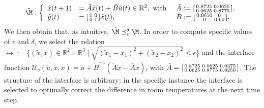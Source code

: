 \documentclass[letterpaper, 10 pt, conference]{amsart}
\theoremstyle{definition}
\theoremstyle{example}
\theoremstyle{remark}
\newcommand{\eps}{\epsilon}
\newcommand{\InF}{\mathcal{U}_{v}}
\begin{document}
 \begin{align}
\tilde\M:\left\{\begin{array}{lll}
 \tilde x(t+1)&= \tilde A\tilde x(t)+ \tilde B  \tilde u(t)\in \mathbb R^2, \mbox{ with }&\tilde A:=\begin{bsmallmatrix}
    0.8725  &  0.0625 \\
    0.0625  &  0.8775 \\
\end{bsmallmatrix},\label{eq:casedyn2}\\
\tilde y(t)&=\begin{bsmallmatrix}1&0\\0&1\end{bsmallmatrix}\tilde x(t),  \quad&\tilde B:=\begin{bsmallmatrix}
    0.0650& 0\\
         0&0.60
\end{bsmallmatrix}.
\end{array}\right.
\end{align}
We then obtain that, as intuitive, $\tilde \M\preceq_{\eps}^{\delta}\M$. 
In order to compute specific values of ${\eps}$ and ${\delta}$, 
we select the relation $\rel:=\{(\tilde x,x)\in \mathbb R^2\times \mathbb R^3\mid  \sqrt{(\tilde x_1- x_1)^2+(\tilde x_2-x_2)^2}\leq \eps \}$ 
and the interface function \(\InF(\tilde u,\tilde x,x)=\tilde u+\tilde B^{-1}(\tilde A \tilde x - \bar Ax )\),  
with $ \bar A = \begin{bsmallmatrix}
    0.8725  &  0.0625 &   0.0375\\
    0.0625  &  0.8775 &   0.0250
    \end{bsmallmatrix}$. 
The structure of the interface is arbitrary: 
in the specific instance the interface is selected to optimally correct the difference in room temperatures at the next time step.  
    
\smallskip    
    
\end{document}
